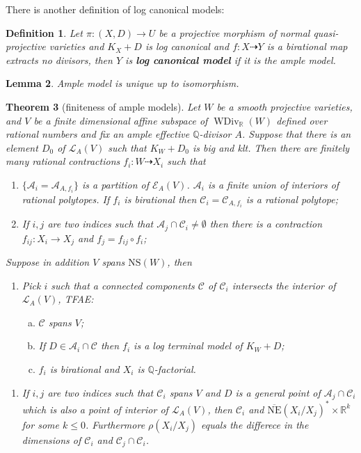 \documentclass{article}
\newtheorem{defn}{Definition}[subsection]
\newtheorem{lem}[defn]{Lemma}
\newtheorem{thm}[defn]{Theorem}
\begin{document}
There is another definition of log canonical models:
\begin{defn}
  Let $ \pi:(X,D)\to U $ be a projective morphism of normal quasi-projective varieties and $ K_X+D $ is log canonical and $ f:X\dashrightarrow Y $ is a birational map extracts no divisors, then $ Y $ is \textbf{ log canonical model} if it is the ample model. 
\end{defn}
\begin{lem}
  Ample model is unique up to isomorphism.
\end{lem}
\begin{thm}[finiteness of ample models]\label{finiteamplemodel}
  Let $W$ be a smooth projective   varieties, and  $ V $ be a finite dimensional affine subspace of $ \operatorname{WDiv}_{\mathbb{R}}(W) $ defined over rational numbers and fix an ample effective $\mathbb{Q}$-divisor $A$. Suppose that there is an element $D_{0}$ of $\mathcal{L}_{A}(V)$ such that $K_{W}+D_{0}$ is big and klt. Then there are finitely many rational contractions $ f_i:W\dashrightarrow X_i $ such that
  \begin{enumerate}[1)]
    \item $ \{\mathcal{A}_i=\mathcal{A}_{A,f_i}\} $ is a partition of $ \mathcal{E}_{A}(V) $. $ \mathcal{A}_i $ is a finite union of interiors of rational polytopes. If $ f_i $ is birational then $ \mathcal{C}_i=\mathcal{C}_{A,f_i} $ is a rational polytope;
    \item If $ i,j $ are two indices such that $ \mathcal{A}_j\cap \mathcal{C}_i\neq \emptyset $ then there is a contraction $ f_{ij}:X_i\to X_j $ and $ f_j=f_{ij}\circ f_i $;
  \end{enumerate}
  Suppose in addition $ V $ spans $ \mathrm{NS}(W) $, then
  \begin{enumerate}[3)]
    \item Pick $ i $ such that a connected components $ \mathcal{C} $ of $ \mathcal{C}_i $ intersects the interior of $ \mathcal{L}_A(V) $, TFAE:
    \begin{enumerate}[a)]
      \item $ \mathcal{C} $ spans $ V $;
      \item If $ D\in \mathcal{A}_i\cap \mathcal{C} $ then $ f_i $ is a log terminal model of $ K_W+D $;
      \item $ f_i $ is birational and $ X_i $ is $ \mathbb{Q} $-factorial.
    \end{enumerate}
  \end{enumerate}
  \begin{enumerate}[4)]
    \item If $ i,j $ are two indices such that $ \mathcal{C}_i $ spans $ V $ and $ D $ is a general point of $ \mathcal{A}_j\cap \mathcal{C}_i $ which is also a point of interior of $ \mathcal{L}_A(V) $, then $ \mathcal{C}_i $ and $ \overline{\mathrm{NE}}(X_i/X_j)^*\times \mathbb{R}^k $ for some $ k\leqslant 0 $. Furthermore $ \rho(X_i/X_j) $ equals the differece in the dimensions of $ \mathcal{C}_i $ and $ \mathcal{C}_j\cap \mathcal{C}_i $.
  \end{enumerate}
\end{thm}
\end{document}
